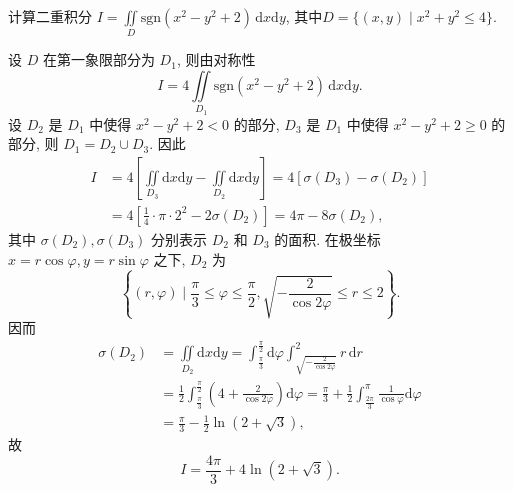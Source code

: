 \documentclass[../../main.tex]{subfiles}
\begin{document}
\begin{example}
计算二重积分 \( I = \iint\limits_D \text{sgn}(x^2 - y^2 + 2) \, \mathrm{d}x\mathrm{d}y \), 其中$D = \{ (x,y) \mid x^2 + y^2 \leqslant 4 \}.$
\end{example}
\begin{solution}
设 \( D \) 在第一象限部分为 \( D_1 \), 则由对称性
\[
I = 4 \iint\limits_{D_1} \text{sgn}(x^2 - y^2 + 2) \, \mathrm{d}x\mathrm{d}y.
\]
设 \( D_2 \) 是 \( D_1 \) 中使得 \( x^2 - y^2 + 2 < 0 \) 的部分, \( D_3 \) 是 \( D_1 \) 中使得 \( x^2 - y^2 + 2 \geqslant 0 \) 的部分, 则 \( D_1 = D_2 \cup D_3 \). 因此
\begin{align*}
I &= 4 \left[ \iint\limits_{D_3} \mathrm{d}x\mathrm{d}y - \iint\limits_{D_2} \mathrm{d}x\mathrm{d}y \right] = 4 [\sigma(D_3) - \sigma(D_2)]
\\
&= 4 \left[ \frac{1}{4} \cdot \pi \cdot 2^2 - 2\sigma(D_2) \right] = 4\pi - 8\sigma(D_2),
\end{align*}
其中 \( \sigma(D_2), \sigma(D_3) \) 分别表示 \( D_2 \) 和 \( D_3 \) 的面积. 在极坐标 \( x = r\cos\varphi, y = r\sin\varphi \) 之下, \( D_2 \) 为
\[
\left\{ (r,\varphi) \mid \frac{\pi}{3} \leqslant \varphi \leqslant \frac{\pi}{2}, \sqrt{-\frac{2}{\cos 2\varphi}} \leqslant r \leqslant 2 \right\}.
\]
因而
\begin{align*}
\sigma(D_2) &= \iint\limits_{D_2} \mathrm{d}x\mathrm{d}y = \int_{\frac{\pi}{3}}^{\frac{\pi}{2}} \mathrm{d}\varphi \int_{\sqrt{-\frac{2}{\cos 2\varphi}}}^2 r \, \mathrm{d}r
\\
&= \frac{1}{2} \int_{\frac{\pi}{3}}^{\frac{\pi}{2}} \left( 4 + \frac{2}{\cos 2\varphi} \right) \mathrm{d}\varphi = \frac{\pi}{3} + \frac{1}{2} \int_{\frac{2\pi}{3}}^{\pi} \frac{1}{\cos\varphi} \mathrm{d}\varphi
\\
&= \frac{\pi}{3} - \frac{1}{2} \ln(2 + \sqrt{3}),
\end{align*}
故
\[
I = \frac{4\pi}{3} + 4\ln(2 + \sqrt{3}).
\]

\end{solution}
\end{document}

